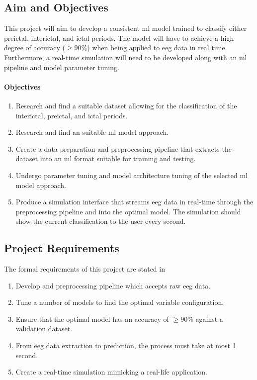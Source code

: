 \documentclass[12pt]{article}
\begin{document}
\subsection{Aim and Objectives}

This project will aim to develop a consistent \acrshort{ml} model trained to classify either preictal, interictal, and ictal periods. The model will have to achieve a high degree of accuracy ($\geq90\%$) when being applied to \acrshort{eeg} data in real time. Furthermore, a real-time simulation will need to be developed along with an \acrshort{ml} pipeline and model parameter tuning.

 
\paragraph{Objectives} \label{objectives}

\begin{enumerate}
\item Research and find a suitable dataset allowing for the classification of the interictal, preictal, and ictal periods.
\item Research and find an suitable \acrshort{ml} model approach.
\item Create a data preparation and preprocessing pipeline that extracts the dataset into an \acrshort{ml} format suitable for training and testing.
\item Undergo parameter tuning and model architecture tuning of the selected \acrshort{ml} model approach.
\item Produce a simulation interface that streams \acrshort{eeg} data in real-time through the preprocessing pipeline and into the optimal model. The simulation should show the current classification to the user every second.
\end{enumerate}

\subsection{Project Requirements}\label{requirements}

The formal requirements of this project are stated in

\begin{enumerate}
\item{Develop and preprocessing pipeline which accepts raw \acrshort{eeg} data.}
\item{Tune a number of models to find the optimal variable configuration.}
\item{Ensure that the optimal model has an accuracy of $\geq90\%$ against a validation dataset.}
\item{From \acrshort{eeg} data extraction to prediction, the process must take at most 1 second.}
\item{Create a real-time simulation mimicking a real-life application.}
\end{enumerate}
\end{document}

